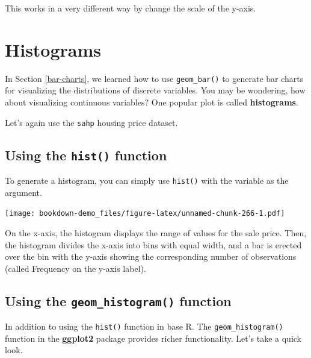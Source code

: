 \documentclass[
]{book}
\newenvironment{Shaded}{\begin{snugshade}}{\end{snugshade}}
\newcommand{\FunctionTok}[1]{\textcolor[rgb]{0.00,0.00,0.00}{#1}}
\newcommand{\NormalTok}[1]{#1}
\newcommand{\SpecialCharTok}[1]{\textcolor[rgb]{0.00,0.00,0.00}{#1}}
\begin{document}
This works in a very different way by change the scale of the y-axis.

\hypertarget{histogram}{%
\section{Histograms}\label{histogram}}

In Section \ref{bar-charts}, we learned how to use \texttt{geom\_bar()} to generate bar charts for visualizing the distributions of discrete variables. You may be wondering, how about visualizing continuous variables? One popular plot is called \textbf{histograms}.

Let's again use the \texttt{sahp} housing price dataset.

\hypertarget{using-the-hist-function}{%
\subsection{\texorpdfstring{Using the \texttt{hist()} function}{Using the hist() function}}\label{using-the-hist-function}}

To generate a histogram, you can simply use \texttt{hist()} with the variable as the argument.

\begin{Shaded}
\end{Shaded}

\texttt{[image: bookdown-demo\_files/figure-latex/unnamed-chunk-266-1.pdf]}

On the x-axis, the histogram displays the range of values for the sale price. Then, the histogram divides the x-axis into bins with equal width, and a bar is erected over the bin with the y-axis showing the corresponding number of observations (called Frequency on the y-axis label).

\hypertarget{using-the-geom_histogram-function}{%
\subsection{\texorpdfstring{Using the \texttt{geom\_histogram()} function}{Using the geom\_histogram() function}}\label{using-the-geom_histogram-function}}

In addition to using the \texttt{hist()} function in base R. The \texttt{geom\_histogram()} function in the \textbf{ggplot2} package provides richer functionality. Let's take a quick look.
\end{document}
